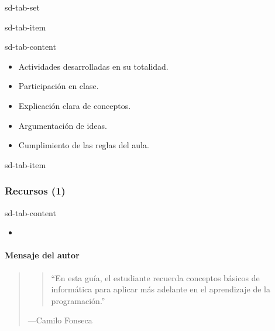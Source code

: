 \documentclass[letterpaper,10pt,spanish]{sphinxmanual}
\begin{document}
\begin{sphinxuseclass}{sd-tab-set}
\begin{sphinxuseclass}{sd-tab-item}
\begin{sphinxuseclass}{sd-tab-content}\begin{itemize}
\item {} 
\sphinxAtStartPar
Actividades desarrolladas en su totalidad.

\item {} 
\sphinxAtStartPar
Participación en clase.

\item {} 
\sphinxAtStartPar
Explicación clara de conceptos.

\item {} 
\sphinxAtStartPar
Argumentación de ideas.

\item {} 
\sphinxAtStartPar
Cumplimiento de las reglas del aula.

\end{itemize}

\end{sphinxuseclass}
\end{sphinxuseclass}
\begin{sphinxuseclass}{sd-tab-item}\subsubsection*{Recursos (1)}

\begin{sphinxuseclass}{sd-tab-content}\begin{itemize}
\item {} 
\sphinxAtStartPar
{\hyperref[\detokenize{cursos/ofimatica11/recursos/T01::doc}]{}}

\end{itemize}

\end{sphinxuseclass}
\end{sphinxuseclass}
\end{sphinxuseclass}

\paragraph{Mensaje del autor}
\label{\detokenize{cursos/ofimatica11/periodo01/G01:mensaje-del-autor}}\begin{quote}
\begin{quote}

\sphinxAtStartPar
“En esta guía, el estudiante recuerda conceptos básicos de informática para aplicar más adelante en el aprendizaje de la programación.”
\end{quote}

\begin{flushright}
---Camilo Fonseca
\end{flushright}
\end{quote}
\end{document}
